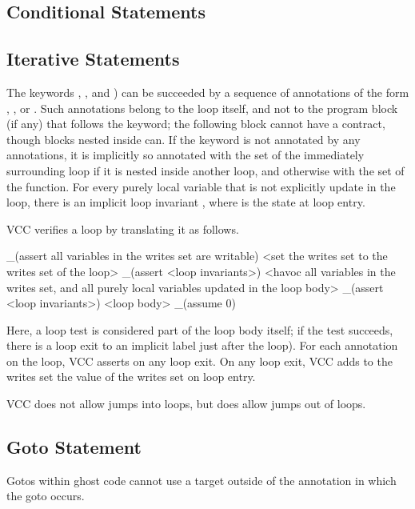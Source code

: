 \documentclass[preprint,nocopyrightspace]{sigplanconf}
\begin{document}
{{{\subsection{Conditional Statements}

\subsection{Iterative Statements}
The keywords , , and ) 
can be succeeded by a sequence of annotations of the form 
, , or 
. Such annotations belong to the loop itself, and
not to the program block (if any) that follows the keyword; the
following block cannot have a contract, though blocks nested inside
can. If the keyword is not annotated by any  annotations,
it is implicitly so annotated with the  set of the
immediately surrounding loop if it is nested inside another loop, and
otherwise with the  set of the function. For every
purely local variable  that is not explicitly update in the
loop, there is an implicit loop invariant ,
where  is the state at loop entry.

VCC verifies a loop by translating it as follows. 

\begin{VCC}
_(assert all variables in the writes set are writable)
<set the writes set to the writes set of the loop>
_(assert <loop invariants>)
<havoc all variables in the writes set, and all purely local variables
 updated in the loop body>
_(assert <loop invariants>)
<loop body>
_(assume 0)

\end{VCC}

Here, a loop test is considered part of the loop body itself; if the
test succeeds, there is a loop exit to an implicit label just after the
loop). For each annotation  on the loop, VCC asserts 
 on any loop exit. On any loop exit, VCC adds to the writes set
the value of the writes set on loop entry.

VCC does not allow jumps into loops, but does allow jumps out of
loops.

\subsection{Goto Statement}
Gotos within ghost code cannot use a target outside of
the  annotation in which the goto occurs.

}}}
\end{document}
